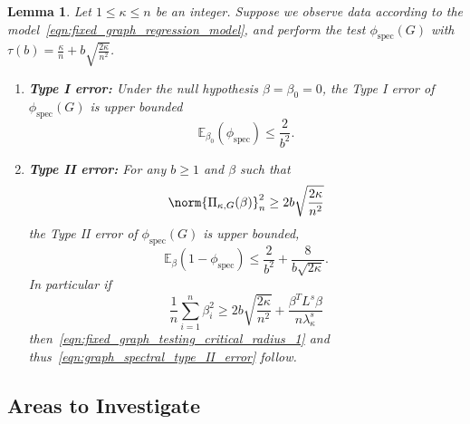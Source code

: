 \documentclass{article}
\newcommand{\1}{\mathbf{1}}
\newcommand{\spec}{\mathrm{spec}}
\theoremstyle{alden}
\theoremstyle{aldenthm}
\newtheorem{lemma}{Lemma}
\theoremstyle{definition}
\theoremstyle{remark}
\begin{document}
\begin{lemma}
	\label{lem:fixed_graph_testing}
	Let $1 \leq \kappa \leq n$ be an integer. Suppose we observe data according to the model~\eqref{eqn:fixed_graph_regression_model}, and perform the test $\phi_{\spec}(G)$ with $\tau(b) = \frac{\kappa}{n} + b\sqrt{\frac{2\kappa}{n^2}}$.
	\begin{enumerate}
		\item \textbf{Type I error:} Under the null hypothesis $\beta = \beta_0 = 0$, the Type I error of $\phi_{\spec}(G)$ is upper bounded
		\begin{equation}
		\label{eqn:graph_spectral_type_I_error}
		\mathbb{E}_{\beta_0}(\phi_{\spec}) \leq \frac{2}{b^2}.
		\end{equation}
		\item \textbf{Type II error:} For any $b \geq 1$ and $\beta$ such that
		\begin{equation}
		\label{eqn:fixed_graph_testing_critical_radius_1}
		\norm{\Pi_{\kappa,G}(\beta)}_n^2 \geq 2b\sqrt{\frac{2\kappa}{n^2}}
		\end{equation}
		the Type II error of $\phi_{\spec}(G)$ is upper bounded,
		\begin{equation}
		\label{eqn:graph_spectral_type_II_error}
		\mathbb{E}_{\beta}(1 - \phi_{\spec}) \leq \frac{2}{b^2} + \frac{8}{b\sqrt{2\kappa}}.
		\end{equation}
		In particular if
		\begin{equation}
		\label{eqn:fixed_graph_testing_critical_radius}
		\frac{1}{n} \sum_{i = 1}^{n} \beta_i^2 \geq 2b\sqrt{\frac{2\kappa}{n^2}} + \frac{\beta^T L^s \beta}{n\lambda_{\kappa}^s}
		\end{equation}
		then~\eqref{eqn:fixed_graph_testing_critical_radius_1} and thus~\eqref{eqn:graph_spectral_type_II_error} follow.
	\end{enumerate}
\end{lemma}

\subsection{Areas to Investigate}
\end{document}
